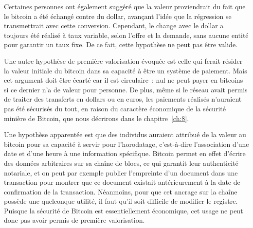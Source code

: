 
Certaines personnes ont également suggéré que la valeur proviendrait du fait que le bitcoin a été échangé contre du dollar, avançant l'idée que la régression se transmettrait avec cette conversion. Cependant, le change avec le dollar a toujours été réalisé à taux variable, selon l'offre et la demande, sans aucune entité pour garantir un taux fixe. De ce fait, cette hypothèse ne peut pas être valide.


Une autre hypothèse de première valorisation évoquée est celle qui ferait résider la valeur initiale du bitcoin dans sa capacité à être un système de paiement. Mais cet argument doit être écarté car il est circulaire~: nul ne peut payer en bitcoins si ce dernier n'a de valeur pour personne. De plus, même si le réseau avait permis de traiter des transferts en dollars ou en euros, les paiements réalisés n'auraient pas été sécurisés du tout, en raison du caractère économique de la sécurité minière de Bitcoin, que nous décrirons dans le chapitre~\ref{ch:8}.


Une hypothèse apparentée est que des individus auraient attribué de la valeur au bitcoin pour sa capacité à servir pour l'horodatage, c'est-à-dire l'association d'une date et d'une heure à une information spécifique. Bitcoin permet en effet d'écrire des données arbitraires sur sa chaîne de blocs, ce qui garantit leur authenticité notariale, et on peut par exemple publier l'empreinte d'un document dans une transaction pour montrer que ce document existait antérieurement à la date de confirmation de la transaction. Néanmoins, pour que cet ancrage sur la chaîne possède une quelconque utilité, il faut qu'il soit difficile de modifier le registre. Puisque la sécurité de Bitcoin est essentiellement économique, cet usage ne peut donc pas avoir permis de première valorisation.

